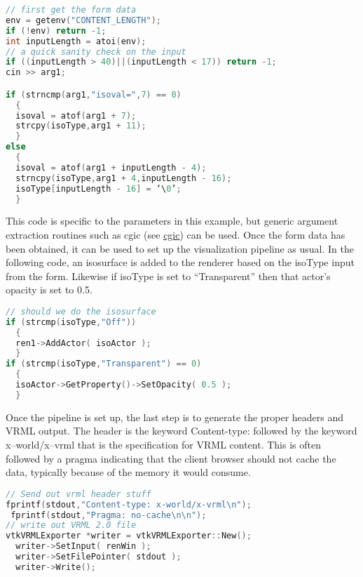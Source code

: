 \begin{lstlisting}[language=C++, caption={}, numbers=none, frame=none]
// first get the form data
env = getenv("CONTENT_LENGTH");
if (!env) return -1;
int inputLength = atoi(env);
// a quick sanity check on the input
if ((inputLength > 40)||(inputLength < 17)) return -1;
cin >> arg1;

if (strncmp(arg1,"isoval=",7) == 0)
  {
  isoval = atof(arg1 + 7);
  strcpy(isoType,arg1 + 11);
  }
else
  {
  isoval = atof(arg1 + inputLength - 4);
  strncpy(isoType,arg1 + 4,inputLength - 16);
  isoType[inputLength - 16] = ‘\0’;
  }
\end{lstlisting}

This code is specific to the parameters in this example, but generic argument extraction routines such as cgic (see \href{https://boutell.com/cgic/}{cgic}) can be used. Once the form data has been obtained, it can be used to set up the visualization pipeline as usual. In the following code, an isosurface is added to the renderer based on the isoType input from the form. Likewise if isoType is set to ``Transparent'' then that actor's opacity is set to 0.5.

\begin{lstlisting}[language=C++, caption={}, numbers=none, frame=none]
// should we do the isosurface
if (strcmp(isoType,"Off"))
  {
  ren1->AddActor( isoActor );
  }
if (strcmp(isoType,"Transparent") == 0)
  {
  isoActor->GetProperty()->SetOpacity( 0.5 );
  }
\end{lstlisting}

Once the pipeline is set up, the last step is to generate the proper headers and VRML output. The header is the keyword Content-type: followed by the keyword x--world/x--vrml that is the specification for VRML content. This is often followed by a pragma indicating that the client browser should not cache the data, typically because of the memory it would consume.

\begin{lstlisting}[language=C++, caption={}, numbers=none, frame=none]
// Send out vrml header stuff
fprintf(stdout,"Content-type: x-world/x-vrml\n");
 fprintf(stdout,"Pragma: no-cache\n\n");
// write out VRML 2.0 file
vtkVRMLExporter *writer = vtkVRMLExporter::New();
  writer->SetInput( renWin );
  writer->SetFilePointer( stdout );
  writer->Write();
\end{lstlisting}

